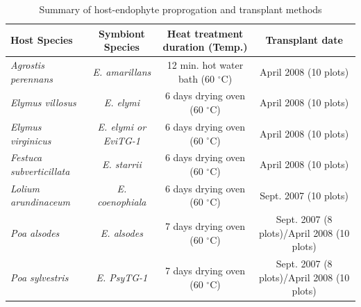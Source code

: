 \documentclass[lineno, sn-basic]{sn-jnl}%
\begin{document}
\begin{table}\centering
	\caption{Summary of host-endophyte proprogation and transplant methods}
	
	\begin{tabular}{lccc}
		Host Species & Symbiont Species & Heat treatment duration (Temp.)& Transplant date\\
		\midrule
		\emph{Agrostis perennans} & \emph{E. amarillans}&12 min. hot water bath (60 $^{\circ}$C)&April 2008 (10 plots)\\
		\emph{Elymus villosus} &\emph{E. elymi}&6 days drying oven (60 $^{\circ}$C)&April 2008 (10 plots)\\
		\emph{Elymus virginicus} &\emph{E. elymi or EviTG-1}&6 days drying oven (60 $^{\circ}$C)&April 2008 (10 plots)\\
		\emph{Festuca subverticillata} &\emph{E. starrii}&6 days drying oven (60 $^{\circ}$C)&April 2008 (10 plots)\\
		\emph{Lolium arundinaceum} &\emph{E. coenophiala}&6 days drying oven (60 $^{\circ}$C)& Sept. 2007 (10 plots)\\
		\emph{Poa alsodes} &\emph{E. alsodes}& 7 days drying oven (60 $^{\circ}$C)&Sept. 2007 (8 plots)/April 2008 (10 plots)\\
		\emph{Poa sylvestris}&\emph{E. PsyTG-1}&7 days drying oven (60 $^{\circ}$C)& Sept. 2007 (8 plots)/April 2008 (10 plots)\\
		\bottomrule
	\end{tabular}
\end{table}

\bigskip
\end{document}
